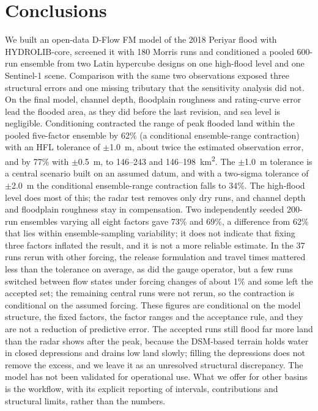 \documentclass[preprint,12pt,authoryear]{elsarticle}
\newcommand{\kmsq}{km\textsuperscript{2}}
\begin{document}
\section{Conclusions}
\label{sec:conclusions}

We built an open-data D-Flow FM model of the 2018 Periyar flood with HYDROLIB-core, screened it with 180 Morris runs and conditioned a pooled 600-run ensemble from two Latin hypercube designs on one high-flood level and one Sentinel-1 scene. Comparison with the same two observations exposed three structural errors and one missing tributary that the sensitivity analysis did not. On the final model, channel depth, floodplain roughness and rating-curve error lead the flooded area, as they did before the last revision, and sea level is negligible. Conditioning contracted the range of peak flooded land within the pooled five-factor ensemble by 62\% (a conditional ensemble-range contraction) with an HFL tolerance of $\pm$1.0~m, about twice the estimated observation error, and by 77\% with $\pm$0.5~m, to 146--243 and 146--198~\kmsq. The $\pm$1.0~m tolerance is a central scenario built on an assumed datum, and with a two-sigma tolerance of $\pm$2.0~m the conditional ensemble-range contraction falls to 34\%. The high-flood level does most of this; the radar test removes only dry runs, and channel depth and floodplain roughness stay in compensation. Two independently seeded 200-run ensembles varying all eight factors gave 73\% and 69\%, a difference from 62\% that lies within ensemble-sampling variability; it does not indicate that fixing three factors inflated the result, and it is not a more reliable estimate. In the 37 runs rerun with other forcing, the release formulation and travel times mattered less than the tolerance on average, as did the gauge operator, but a few runs switched between flow states under forcing changes of about 1\% and some left the accepted set; the remaining central runs were not rerun, so the contraction is conditional on the assumed forcing. These figures are conditional on the model structure, the fixed factors, the factor ranges and the acceptance rule, and they are not a reduction of predictive error. The accepted runs still flood far more land than the radar shows after the peak, because the DSM-based terrain holds water in closed depressions and drains low land slowly; filling the depressions does not remove the excess, and we leave it as an unresolved structural discrepancy. The model has not been validated for operational use. What we offer for other basins is the workflow, with its explicit reporting of intervals, contributions and structural limits, rather than the numbers.
\end{document}
